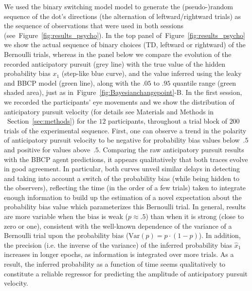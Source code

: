 \documentclass[10pt,letterpaper]{article}
\newcommand{\seeFig}[1]{Figure~\ref{fig:#1}}
\newcommand{\seeSec}[1]{Section~\ref{sec:#1}}
\begin{document}
We used the binary switching model model to generate the (pseudo-)random sequence of
the dot's directions (the alternation of leftward/rightward trials)
as the sequence of observations that were used in both sessions
(see~\seeFig{results_psycho}).
In the top panel  of~\seeFig{results_psycho} we show the actual sequence of binary choices
(TD, leftward or rightward) of the Bernoulli trials,
whereas in the panel below we compare the evolution of the recorded anticipatory pursuit (grey line) with
the true value of the hidden probability bias $x_1$ (step-like blue curve),
and the value inferred using the leaky and BBCP model (green line),
along with the $.05$ to $.95$ quantile range (green shaded area),
just as in~\seeFig{Bayesianchangepoint}-B.
In the first session, we recorded the participants' eye movements and
we show the distribution of anticipatory pursuit velocity (for details see Materials and Methods in ~\seeSec{methods})
for the $12$ participants, throughout a trial block of $200$ trials of the experimental sequence.
First, one can observe a trend in the polarity of anticipatory pursuit velocity
to be negative for probability bias values below~$.5$ and positive for values above~$.5$.
Comparing the raw anticipatory pursuit results with the BBCP agent predictions,
it appears qualitatively that both traces evolve in good agreement.
In particular, both curves unveil similar delays in detecting and
taking into account a switch of the probability bias (while being hidden to the observers),
reflecting the time (in the order of a few trials) taken to integrate enough information
to build up the estimation of a novel expectation about the probability bias value
which parameterizes this Bernoulli trial.
In general, results are more variable when the bias is weak ($p\approx .5$)
than when it is strong (close to zero or one),
consistent with the well-known dependence of the variance of a Bernoulli trial
upon the probability bias ($\textrm{Var}(p)= p \cdot (1-p)$).
In addition, the precision (i.e. the inverse of the variance)
of the inferred probability bias $\hat{x}_1$ increases
in longer epochs, as information is integrated over more trials.
As a result, the inferred probability as a function of time
seems qualitatively to constitute a reliable regressor
for predicting the amplitude of anticipatory pursuit velocity.
\end{document}

